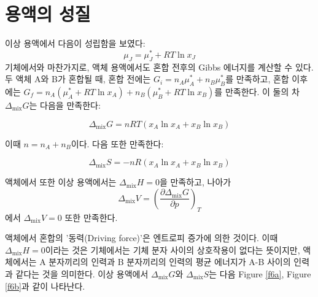     \section{용액의 성질}
        \hspace{\parindent}이상 용액에서 다음이 성립함을 보였다:
        $$
        \mu_J = \mu_J^\ast + RT \ln{x_J}
        $$
        기체에서와 마찬가지로, 액체 용액에서도 혼합 전후의 Gibbs 에너지를 계산할 수 있다. 두 액체 A와 B가 혼합될 때,
        혼합 전에는 $G_i = n_A \mu_A^\ast + n_B \mu_B^\ast$를 만족하고, 혼합 이후에는 $G_f = n_A\left(\mu_A^\ast + RT \ln{x_A}\right) + n_B\left(\mu_B^\ast + RT\ln{x_B}\right)$를 
        만족한다. 이 둘의 차 $\Delta_\mathrm{mix}G$는 다음을 만족한다:
        \begin{obs}\label{reggibbs}
        \begin{equation*}
            \Delta_\mathrm{mix}G=nRT\left(x_A\ln{x_A}+x_B\ln{x_B}\right)
        \end{equation*}
        \end{obs}
        이때 $n=n_A+n_B$이다. 다음 또한 만족한다:
        \begin{obs}
        \begin{equation*}
            \Delta_\mathrm{mix}S=-nR\left(x_A\ln{x_A} + x_B\ln{x_B}\right)
        \end{equation*}
        \end{obs}
        액체에서 또한 이상 용액에서는 $\Delta_\mathrm{mix}H = 0$을 만족하고, 나아가 
        $$
        \Delta_\mathrm{mix}V=\left(\frac{\partial \Delta_\mathrm{mix}G}{\partial p}\right)_T
        $$
        에서 
        $\Delta_\mathrm{mix}V = 0$ 또한 만족한다.
        \par 액체에서 혼합의 '동력(Driving force)'은 엔트로피 증가에 의한 것이다. 이때 $\Delta_\mathrm{mix}H=0$이라는 것은 기체에서는 
        기체 분자 사이의 상호작용이 없다는 뜻이지만, 액체에서는 A 분자끼리의 인력과 B 분자끼리의 인력의 평균 에너지가 A-B 사이의 인력과 같다는 것을 의미한다. 
        이상 용액에서 $\Delta_\mathrm{mix}G$와 $\Delta_\mathrm{mix}S$는 다음 Figure \ref{f6a}, Figure \ref{f6b}과 같이 나타난다.

